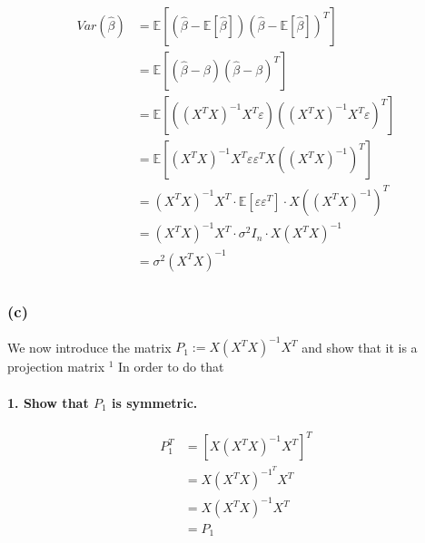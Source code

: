 \documentclass{article}
\newcommand{\E}{\mathbb{E}}
\begin{document}
\begin{align*}
    Var(\hat \beta)
     & = \E \left[ \left( \hat \beta - \E[\hat \beta ]\right) \left( \hat \beta - \E[\hat \beta]\right)^T \right]                            \\
     & = \E \left[ \left( \hat \beta - \beta \right) \left( \hat \beta - \beta \right)^T \right]                                             \\
     & = \E \left[ \left( \left(X^T X \right)^{-1} X^T \varepsilon \right) \left( \left(X^T X \right)^{-1} X^T \varepsilon \right)^T \right] \\
     & = \E \left[ \left(X^T X \right)^{-1} X^T \varepsilon \varepsilon^T X \left(\left(X^T X \right)^{-1} \right)^T \right]                 \\
     & = \left(X^T X \right)^{-1} X^T \cdot \E \left[ \varepsilon \varepsilon^T \right] \cdot X \left(\left(X^T X \right)^{-1} \right)^T     \\
     & = \left(X^T X \right)^{-1} X^T \cdot \sigma^2 I_n \cdot X \left(X^T X \right)^{-1}                                                    \\
     & = \sigma^2 \left(X^T X \right)^{-1}                                                                                                   \\
\end{align*}

\subsubsection{(c)}
We now introduce the matrix $P_{1}:=X\left(X^{T} X\right)^{-1} X^{T}$ and show that it is a projection matrix ${ }^{1}$ In order to do that

\paragraph{1. Show that $P_{1}$ is symmetric.}
\begin{align*}
    P_1^T
     & = \left[ X\left(X^{T} X\right)^{-1} X^{T} \right]^T \\
     & = X\left(X^{T} X\right)^{-1^T} X^{T}                \\
     & = X\left(X^{T} X\right)^{-1} X^{T}                  \\
     & = P_1                                               \\
\end{align*}
\end{document}
